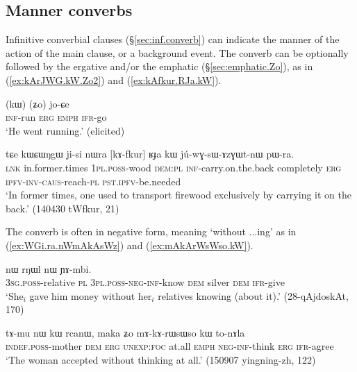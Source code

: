 \subsection{Manner converbs} \label{sec:manner.converbs}
Infinitive converbial clauses (§\ref{sec:inf.converb}) can indicate the manner of the action of the main clause, or a background event. The converb can be optionally followed by the ergative  and/or the emphatic  (§\ref{sec:emphatic.Zo}), as in (\ref{ex:kArJWG.kW.Zo2}) and (\ref{ex:kAfkur.RJa.kW}).

\begin{exe}
\ex \label{ex:kArJWG.kW.Zo2}
\gll [kɤ-rɟɯɣ] (kɯ) (ʑo) jo-ɕe \\
\textsc{inf}-run \textsc{erg} \textsc{emph} \textsc{ifr}-go \\
\glt `He went running.' (elicited)
\end{exe}

\begin{exe}
\ex \label{ex:kAfkur.RJa.kW}
\gll tɕe kɯɕɯŋgɯ ji-si nɯra [kɤ-fkur] ʁɟa kɯ jú-wɣ-sɯ-ɤzɣɯt-nɯ pɯ-ra. \\
\textsc{lnk} in.former.times \textsc{1pl}.\textsc{poss}-wood \textsc{dem}:\textsc{pl} \textsc{inf}-carry.on.the.back completely \textsc{erg} \textsc{ipfv}-\textsc{inv}-\textsc{caus}-reach-\textsc{pl} \textsc{pst}.\textsc{ipfv}-be.needed \\
\glt `In former times, one used to transport firewood exclusively by carrying it on the back.' (140430 tWfkur, 21)
\end{exe}


The converb is often in negative form, meaning `without ...ing' as in  (\ref{ex:WGi.ra.nWmAkAsWz}) and (\ref{ex:mAkArWsWso.kW}).

\begin{exe}
\ex \label{ex:WGi.ra.nWmAkAsWz}
\gll  [ɯ-ɣi ra nɯ-mɤ-kɤ-sɯz] nɯ rŋɯl nɯ ɲɤ-mbi. \\
\textsc{3sg}.\textsc{poss}-relative \textsc{pl} \textsc{3pl}.\textsc{poss}-\textsc{neg}-\textsc{inf}-know \textsc{dem} silver \textsc{dem} \textsc{ifr}-give \\
\glt `She$_i$ gave him money without her$_i$ relatives knowing (about it).' (28-qAjdoskAt, 170)
\end{exe}


\begin{exe}
\ex \label{ex:mAkArWsWso.kW}
\gll  tɤ-mu nɯ kɯ rcanɯ, maka ʑo mɤ-kɤ-rɯsɯso kɯ to-nɤla \\
\textsc{indef}.\textsc{poss}-mother \textsc{dem} \textsc{erg} \textsc{unexp}:\textsc{foc} at.all \textsc{emph} \textsc{neg}-\textsc{inf}-think \textsc{erg} \textsc{ifr}-agree \\
\glt `The woman accepted without thinking at all.' (150907 yingning-zh, 122)
\end{exe}

